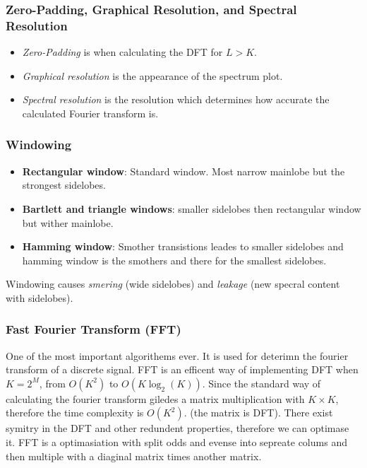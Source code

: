 \subsubsection{Zero-Padding, Graphical Resolution, and Spectral Resolution}
\begin{itemize}
    \item \textit{Zero-Padding} is when calculating the DFT for $L>K$.
    \item \textit{Graphical resolution} is the appearance of the spectrum plot.
    \item \textit{Spectral resolution} is the resolution which determines how accurate the calculated Fourier transform is.
\end{itemize}


\subsubsection{Windowing}
\begin{itemize}
    \item \textbf{Rectangular window}: Standard window. Most narrow mainlobe but the strongest sidelobes.
    \item \textbf{Bartlett and triangle windows}: smaller sidelobes then rectangular window but wither mainlobe.
    \item \textbf{Hamming window}: Smother transistions leades to smaller sidelobes and hamming window is the smothers and
    there for the smallest sidelobes.
\end{itemize}

Windowing causes \textit{smering} (wide sidelobes) and \textit{leakage} (new specral content with sidelobes).

\subsubsection{Fast Fourier Transform (FFT)}
One of the most important algorithems ever. It is used for deterimn the fourier transform
of a discrete signal. 
FFT is an efficent way of implementing DFT when $K=2^M$, from $O(K^2)$ to $O(K\log_2(K))$. 
Since the standard way of calculating the fourier transform giledes a matrix multiplication
with $K\times K$, therefore the time complexity is $O(K^2)$. (the matrix is DFT).
There exist symitry in the DFT and other redundent properties, therefore we can optimase 
it. FFT is a optimasiation with split odds and evense into sepreate colums and then multiple
with a diaginal matrix times another matrix.


